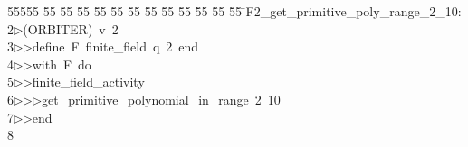 %
%
\begin{tabbing}
55555 \= 55 \= 55 \= 55 \= 55 \= 55 \= 55 \= 55 \= 55 \= 55 \= 55 \= 55 \= 55 \= \>F2\_get\_primitive\_poly\_range\_2\_10:\\[0pt]
2\>$\triangleright$\>(ORBITER)\ v\ 2\ \\[0pt]
3\>$\triangleright$\>$\triangleright$\>define\ F\ finite\_field\ q\ 2\ end\ \\[0pt]
4\>$\triangleright$\>$\triangleright$\>with\ F\ do\ \\[0pt]
5\>$\triangleright$\>$\triangleright$\>finite\_field\_activity\ \\[0pt]
6\>$\triangleright$\>$\triangleright$\>$\triangleright$\>get\_primitive\_polynomial\_in\_range\ 2\ 10\ \\[0pt]
7\>$\triangleright$\>$\triangleright$\>end\\[0pt]
8\>\end{tabbing}
